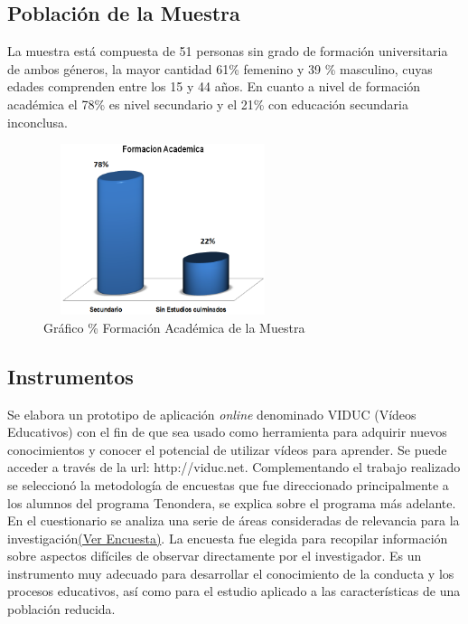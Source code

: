 \documentclass[runningheads]{llncs}
\begin{document}
\subsection{Población de la Muestra}
La muestra está compuesta de 51 personas sin grado de formación universitaria de ambos géneros, la mayor cantidad 61\% femenino y 39 \% masculino, cuyas edades comprenden entre los 15 y 44 años. En cuanto a nivel de formación académica el 78\% es nivel secundario y el 21\% con educación secundaria inconclusa.
\begin{figure}[h]
\caption{Gráfico \% Formación Académica de la Muestra}
\centering
\includegraphics[width=7cm, height=5cm]{muestragenero.PNG}
\end{figure}

\subsection{Instrumentos}
Se elabora un prototipo de aplicación \textit{online} denominado VIDUC (Vídeos Educativos) con el fin de que sea usado como herramienta para adquirir nuevos conocimientos y conocer el potencial de utilizar vídeos para aprender. Se puede acceder a través de la url: http://viduc.net.
Complementando el trabajo realizado se seleccionó la metodología de encuestas que fue direccionado principalmente a los alumnos del programa Tenondera, se explica sobre el programa más adelante.
En el cuestionario se analiza una serie de áreas consideradas de relevancia para la investigación\href{https://forms.gle/JvFyK6oAv7Ca7vGF9/}{(Ver Encuesta)}. La encuesta fue elegida para recopilar información sobre aspectos difíciles de observar directamente por el investigador. Es un instrumento muy adecuado para desarrollar el conocimiento de la conducta y los procesos educativos, así como para el estudio aplicado a las características de una población reducida.
\end{document}

